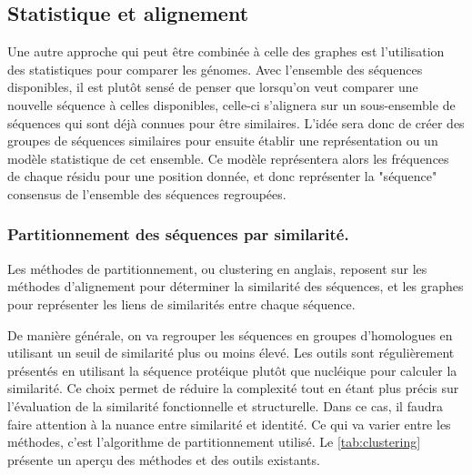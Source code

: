 \subsection{Statistique et alignement}

Une autre approche qui peut être combinée à celle des graphes est l'utilisation des statistiques pour comparer les génomes. Avec l'ensemble des séquences disponibles, il est plutôt sensé de penser que lorsqu'on veut comparer une nouvelle séquence à celles disponibles, celle-ci s'alignera sur un sous-ensemble de séquences qui sont déjà connues pour être similaires. L'idée sera donc de créer des groupes de séquences similaires pour ensuite établir une représentation ou un modèle statistique de cet ensemble. Ce modèle représentera alors les fréquences de chaque résidu pour une position donnée, et donc représenter la "séquence" consensus de l'ensemble des séquences regroupées. 

\subsubsection{Partitionnement des séquences par similarité. }

Les méthodes de partitionnement, ou clustering en anglais, reposent sur les méthodes d'alignement pour déterminer la similarité des séquences, et les graphes pour représenter les liens de similarités entre chaque séquence. 

De manière générale, on va regrouper les séquences en groupes d'homologues en utilisant un seuil de similarité plus ou moins élevé. Les outils sont régulièrement présentés en utilisant la séquence protéique plutôt que nucléique pour calculer la similarité. Ce choix permet de réduire la complexité tout en étant plus précis sur l'évaluation de la similarité fonctionnelle et structurelle. Dans ce cas, il faudra faire attention à la nuance entre similarité et identité. Ce qui va varier entre les méthodes, c'est l'algorithme de partitionnement utilisé. Le \autoref{tab:clustering} présente un aperçu des méthodes et des outils existants.  

